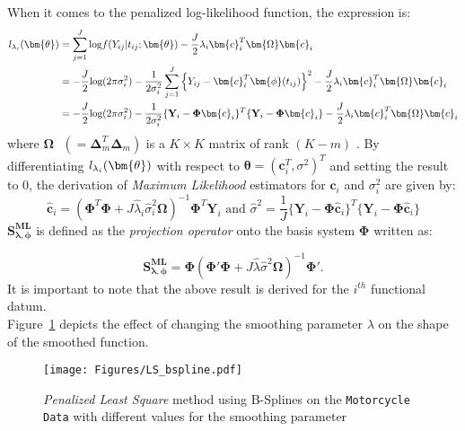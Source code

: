 When it comes to the penalized log-likelihood function, the expression is:
\begin{align}\label{penalized_likelihood}
\text{\textit{l}}_{\lambda_i}(\bm{\theta})&= \sum_{j=1}^{J}\text{log}f(Y_{ij}|t_{ij};\bm{\theta})-\frac{J}{2}\lambda_i \bm{c}^T_i \bm{\Omega} \bm{c}_i \nonumber \\
     &= -\frac{J}{2} \text{log}(2\pi \sigma^2_i) -\frac{1}{2\sigma^2_i}\sum_{j=1}^{J}\left\{Y_{ij}-\bm{c}_i^T\bm{\phi}(t_{ij})\right\}^2- \frac{J}{2}\lambda_i \bm{c}^T_i \bm{\Omega} \bm{c}_i \nonumber \\
     &= -\frac{J}{2} \text{log}(2\pi \sigma^2_i)-\frac{1}{2\sigma^2_i}\{\mathbf{Y}_i-\mathbf{\Phi}\bm{c}_i\}^T\{\mathbf{Y}_i-\mathbf{\Phi}\bm{c}_i\}- \frac{J}{2}\lambda_i \bm{c}_i^T \bm{\Omega} \bm{c}_i
\end{align}
where $\bm{\Omega}\text{ } (= \bm{\Delta}^T_m \bm{\Delta}_m)$ is a $K \times K$ matrix of rank $\left(K-m\right)$ \citep{Konishi2004}. By differentiating $\text{\textit{l}}_{\lambda_i}(\bm{\theta})$ with respect to $\bm{\theta} = (\bm{c}_i^T,\sigma^2)^T$ and setting the result to $0$, the derivation of \textit{Maximum Likelihood} estimators for $\bm{c}_i$ and $\sigma^2_i$ are given by:
\begin{equation}\label{solution_eqpen}
\bm{\hat{c}}_i=\left(\bm{\Phi}^T \bm{\Phi} + J \hat{\lambda}_i \hat{\sigma}^2_i \bm{\Omega}\right)^{-1}\bm{\Phi}^T \bm{Y}_i \text{    and    } \hat{\sigma}^2 = \dfrac{1}{J}\{\bm{Y}_i-\bm{\Phi}\bm{\hat{c}}_i\}^T\{\bm{Y}_i-\bm{\Phi}\bm{\hat{c}}_i\}
\end{equation}
\clearpage
$\bm{S_{\lambda,\phi}^{ML}}$ is defined as the \textit{projection operator} onto the basis system $\bm{\Phi}$ written as:

\begin{equation}\label{project_op2}
\mathbf{S_{\lambda,\phi}^{ML}} = \bm{\Phi}\left(\mathbf{\Phi}'\mathbf{\Phi}+J \hat{\lambda} \hat{\sigma}^2 \bm{\Omega}\right)^{-1}\mathbf{\Phi}'.
\end{equation}
It is important to note that the above result is derived for the $i^{th}$ functional datum.\\
Figure~\ref{fig:four_plots} depicts the effect of changing the smoothing parameter $\lambda$ on the shape of the smoothed function.  

\begin{figure}[h]
  \centering
    \texttt{[image: Figures/LS\_bspline.pdf]}
  \caption[\textit{Penalized Least Square} method using B-Splines]{\textit{Penalized Least Square} method using B-Splines on the \texttt{Motorcycle Data} with different values for the smoothing parameter}
  \label{fig:four_plots}
\end{figure}
\clearpage

